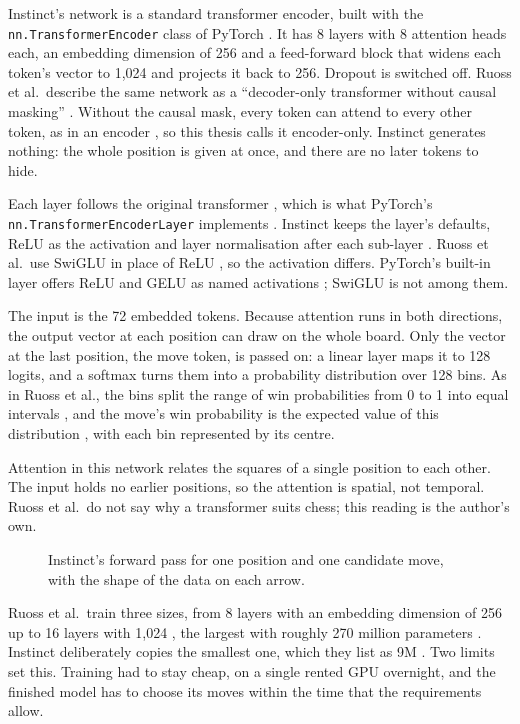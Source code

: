 Instinct's network is a standard transformer encoder, built with the \texttt{nn.\allowbreak TransformerEncoder} class of PyTorch \cite{pytorch}.
It has 8 layers with 8 attention heads each, an embedding dimension of 256 and a feed-forward block that widens each token's vector to 1,024 and projects it back to 256.
Dropout is switched off.
Ruoss et al.\ describe the same network as a ``decoder-only transformer without causal masking'' \cite{Ruoss2024}.
Without the causal mask, every token can attend to every other token, as in an encoder \cite{Vaswani2017}, so this thesis calls it encoder-only.
Instinct generates nothing: the whole position is given at once, and there are no later tokens to hide.

Each layer follows the original transformer \cite{Vaswani2017}, which is what PyTorch's \texttt{nn.\allowbreak TransformerEncoderLayer} implements \cite{pytorch}.
Instinct keeps the layer's defaults, \ac{ReLU} as the activation and layer normalisation after each sub-layer \cite{pytorch}.
Ruoss et al.\ use SwiGLU in place of \ac{ReLU} \cite{Ruoss2024}, so the activation differs.
PyTorch's built-in layer offers \ac{ReLU} and GELU as named activations \cite{pytorch}; SwiGLU is not among them.

The input is the 72 embedded tokens.
Because attention runs in both directions, the output vector at each position can draw on the whole board.
Only the vector at the last position, the move token, is passed on: a linear layer maps it to 128 logits, and a softmax turns them into a probability distribution over 128 bins.
As in Ruoss et al., the bins split the range of win probabilities from 0 to 1 into equal intervals \cite{Ruoss2024}, and the move's win probability is the expected value of this distribution \cite{Ruoss2024}, with each bin represented by its centre.

Attention in this network relates the squares of a single position to each other.
The input holds no earlier positions, so the attention is spatial, not temporal.
Ruoss et al.\ do not say why a transformer suits chess; this reading is the author's own.

\begin{figure}[htbp]
  \centering
  
  \caption{Instinct's forward pass for one position and one candidate move, with the shape of the data on each arrow.}
  \label{fig:instinct-forward}
\end{figure}

Ruoss et al.\ train three sizes, from 8 layers with an embedding dimension of 256 up to 16 layers with 1,024 \cite{Ruoss2024}, the largest with roughly 270 million parameters \cite{Ruoss2024}.
Instinct deliberately copies the smallest one, which they list as 9M \cite{Ruoss2024}.
Two limits set this.
Training had to stay cheap, on a single rented \ac{GPU} overnight, and the finished model has to choose its moves within the time that the requirements allow.

